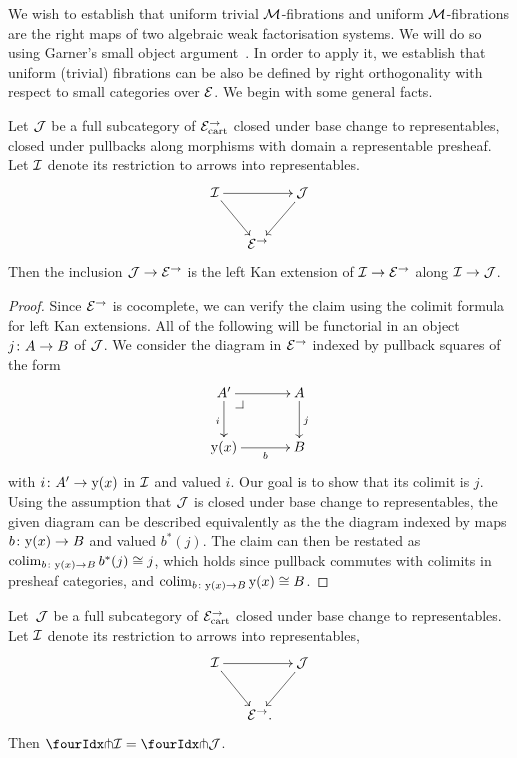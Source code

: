 \documentclass[reqno,10pt,a4paper,oneside,draft]{amsart}
\begin{document}
We wish to establish that uniform trivial $\cal{M}$-fibrations and uniform $\cal{M}$-fibrations are the right maps of two algebraic weak factorisation systems.
We will do so using Garner's small object argument~\cite{garner:small-object-argument}.
In order to apply it, we establish that uniform (trivial) fibrations can be also be defined by right orthogonality 
with respect to small categories over $\catE$. We begin with some general facts.

\begin{lemma} \label{left-kan-extension-of-representables}
Let $\cal{J}$ be a full subcategory of $\catE_{\cart}^\to$ closed under base change to representables, \ie closed under pullbacks along morphisms with domain a representable presheaf.
Let $\cal{I}$ denote its restriction to arrows into representables.
\[
\xymatrix@C-1em{
  \cal{I}
  \ar[rr]
  \ar[dr]
&&
  \cal{J}
  \ar[dl]
\\&
  \catE^\to
}
\]
Then the inclusion $\cal{J} \to \catE^\to$ is the left Kan extension of $\cal{I} \to \catE^\to$ along $\cal{I} \to \cal{J}$.
\end{lemma}

\begin{proof}
Since $\catE^\to$ is cocomplete, we can verify the claim using the colimit formula for left Kan extensions.
All of the following will be functorial in an object $j \co A \to B$ of $\cal{J}$.
We consider the diagram in $\catE^\to$ indexed by pullback squares of the form
\[
\xymatrix@C=1.2cm{
  A'
  \ar[r]
  \ar[d]_{i}
  \pullback{dr}
&
  A
  \ar[d]^{j}
\\
  \yon(x)
  \ar[r]_-{b}
&
  B
}
\]
with $i \co A' \to \yon(x)$ in $\cal{I}$ and valued $i$.
Our goal is to show that its colimit is $j$.
Using the assumption that $\cal{J}$ is closed under base change to representables, the given diagram can be described equivalently as the the diagram indexed by maps $b \co \yon(x) \to B$ and valued $b^*(j)$.
The claim can then be restated as $\colim_{b \co \yon(x) \to B} b^*(j) \iso j$, which holds since pullback commutes with colimits in presheaf categories, and $\colim_{b \co \yon(x) \to B} \yon(x) \iso B$.
\end{proof}

\begin{proposition} \label{awfs-on-arrows-into-representables}
Let~$\cal{J}$ be a full subcategory of $\catE_{\cart}^\to$ closed under base change to representables.
Let $\cal{I}$ denote its restriction to arrows into representables,
\[
\xymatrix@C-1em{
  \cal{I}
  \ar[rr]
  \ar[dr]
&&
  \cal{J}
  \ar[dl]
\\&
  \catE^\to
\rlap{.}}
\]
Then $\liftr{\cal{I}} = \liftr{\cal{J}}$.
\end{proposition}
\end{document}
